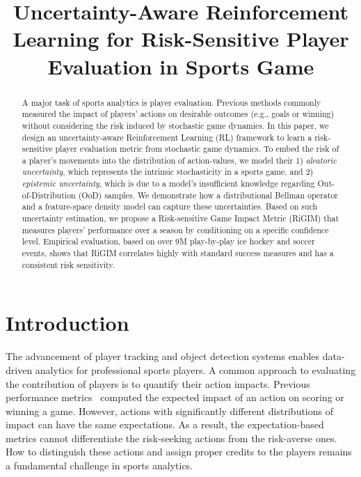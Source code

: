 \documentclass{article}
\title{Uncertainty-Aware Reinforcement Learning for Risk-Sensitive Player Evaluation in Sports Game}
\author{}
\begin{document}
\maketitle
\vspace{-0.2in}
\begin{abstract}
\vspace{-0.1in}
A major task of sports analytics is player evaluation. Previous methods commonly measured the impact of players' actions on desirable outcomes (e.g., goals or winning) without considering the risk induced by stochastic game dynamics.  In this paper, we design an uncertainty-aware Reinforcement Learning (RL) framework to learn a risk-sensitive player evaluation metric from stochastic game dynamics. To embed the risk of a player’s movements into the distribution of action-values, we model their 1) {\it aleatoric uncertainty}, which represents the intrinsic stochasticity in a sports game, and 2) {\it epistemic uncertainty}, which is due to a model's insufficient knowledge regarding Out-of-Distribution (OoD) samples. We demonstrate how a distributional Bellman operator and a feature-space density model can capture these uncertainties. Based on such uncertainty estimation, we propose a Risk-sensitive Game Impact Metric (RiGIM) that measures players' performance over a season by conditioning on a specific confidence level. Empirical evaluation, based on over 9M play-by-play ice hockey and soccer events, shows that RiGIM correlates highly with standard success measures and has a consistent risk sensitivity.
\end{abstract}
\vspace{-0.1in}
\section{Introduction}
\vspace{-0.05in}
The advancement of player tracking and object detection systems enables data-driven analytics for professional sports players. A common approach to evaluating the contribution of players is to quantify their action impacts.  Previous performance metrics~\cite{Routley2015Markov,Liu2018DRL,Decroos2019Actions,Luo2020IRL} computed the expected impact of an action on scoring or winning a game. However, actions with significantly different distributions of impact can have the same expectations. As a result, the expectation-based metrics cannot differentiate the risk-seeking actions from the risk-averse ones. How to distinguish these actions and assign proper credits to the players remains a fundamental challenge in sports analytics.
\end{document}
